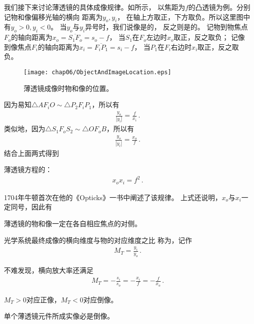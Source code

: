 我们接下来讨论薄透镜的具体成像规律。如所示，
以焦距为$f$的凸透镜为例。分别记物和像偏移光轴的横向
距离为$y_o, y_i$，
在轴上方取正，下方取负。所以这里图中有$y_o>0, y_i<0$。
当$y_o$与$y_i$异号时，我们说像是的，
反之则是的。
记物到物焦点$F_o$的轴向距离为$x_o=\overline{S_1F_o}=s_o-f$，
当$S_1$在$F_o$左边时$x_o$取正，反之取负；
记像到像焦点$F_i$的轴向距离为$x_i=\overline{F_iP_1}=s_i-f$，
当$P_1$在$F_i$右边时$x_i$取正，反之取负。
\begin{figure}[htbp]
    \centering\texttt{[image: chap06/ObjectAndImageLocation.eps]}
    \caption{薄透镜成像时物和像的位置。}
    \label{fig:6.39}
\end{figure}

因为易知$\triangle AF_iO\sim\triangle P_2F_iP_1$，所以有
\begin{align}
    \frac{y_o}{|y_i|}=\frac{f}{x_i}\, .
\end{align}
类似地，因为$\triangle S_1F_oS_2\sim\triangle OF_oB$，所以有
\begin{align}
    \frac{y_o}{|y_i|}=\frac{x_o}{f}\, .
\end{align}
结合上面两式得到
\begin{proposition}
    薄透镜方程的：
    \begin{align}
        x_ox_i=f^2\, .
    \end{align}
\end{proposition}
1704年牛顿首次在他的《Opticks》一书中阐述了该规律。
上式还说明，$x_o$与$x_i$一定同号，因此有
\begin{corollary}
    薄透镜的物和像一定在各自相应焦点的对侧。
\end{corollary}

\begin{definition}
    光学系统最终成像的横向维度与物的对应维度之比
    称为，记作
    \begin{align}
        M_T=\frac{y_i}{y_o}\, .
    \end{align}
\end{definition}
不难发现，横向放大率还满足
\begin{align}
    M_T=-\frac{s_i}{s_o}=-\frac{x_i}{f}=-\frac{f}{x_o}\, .
\end{align}

\begin{corollary}
    $M_T>0$对应正像，$M_T<0$对应倒像。
\end{corollary}
\begin{corollary}
    单个薄透镜元件所成实像必是倒像。
\end{corollary}

